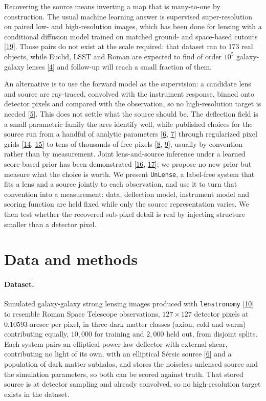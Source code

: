 \documentclass{article}
\newcommand{\rf}[1]{\hyperlink{ref#1}{#1}}
\begin{document}
Recovering the source means inverting a map that is many-to-one by
construction. The usual machine learning answer is supervised
super-resolution on paired low- and high-resolution images, which has been done
for lensing with a conditional diffusion model trained on matched ground- and
space-based cutouts [\rf{19}]. Those pairs do not exist at the scale required:
that dataset ran to 173 real objects, while Euclid, LSST and Roman are expected
to find of order $10^{5}$ galaxy-galaxy lenses [\rf{4}] and follow-up will reach
a small fraction of them.

An alternative is to use the forward model as the supervision: a candidate lens
and source are ray-traced, convolved with the instrument response, binned onto
detector pixels and compared with the observation, so no high-resolution target
is needed [\rf{5}]. This does not settle what the source should be. The
deflection field is a small parametric family the arcs identify well, while
published choices for the source run from a handful of analytic parameters
[\rf{6}, \rf{7}] through regularized pixel grids [\rf{14}, \rf{15}] to tens of
thousands of free pixels [\rf{8}, \rf{9}], usually by convention rather than by
measurement. Joint lens-and-source inference under a learned score-based prior
has been demonstrated [\rf{16}, \rf{17}]; we propose no new prior but measure
what the choice is worth. We present \texttt{UnLense}, a label-free system that
fits a lens and a
source jointly to each observation, and use it to turn that convention into a
measurement: data, deflection model, instrument model and scoring function are
held fixed while only the source representation varies. We then test whether the
recovered sub-pixel detail is real by injecting structure smaller than a detector
pixel.

\section{Data and methods}
\label{data_and_methods}

\paragraph{Dataset.} Simulated galaxy-galaxy strong lensing images produced with
\texttt{lenstronomy} [\rf{10}] to resemble Roman Space Telescope observations,
$127 \times 127$ detector pixels at $0.10593$ arcsec per pixel, in three dark
matter classes (axion, cold and warm) contributing equally, $10{,}000$ for
training and $2{,}000$ held out, from disjoint splits. Each
system pairs an elliptical power-law deflector with external shear, contributing
no light of its own, with an elliptical S\'ersic source [\rf{6}] and a population
of dark matter subhalos, and stores the noiseless unlensed source and the
simulation parameters, so both can be scored against truth. That stored source is at detector sampling and already
convolved, so no high-resolution target exists in the dataset.
\end{document}

